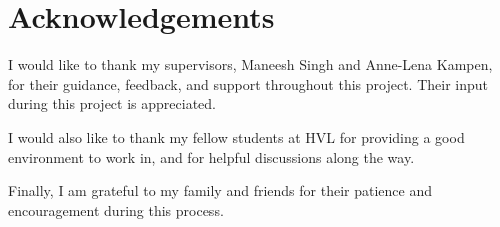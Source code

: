 \chapter*{Acknowledgements}
\pagestyle{pre}

I would like to thank my supervisors, Maneesh Singh and Anne-Lena Kampen, for their
guidance, feedback, and support throughout this project. Their input during this project is appreciated.

I would also like to thank my fellow students at HVL for providing a good environment
to work in, and for helpful discussions along the way.

Finally, I am grateful to my family and friends for their patience and encouragement
during this process.
